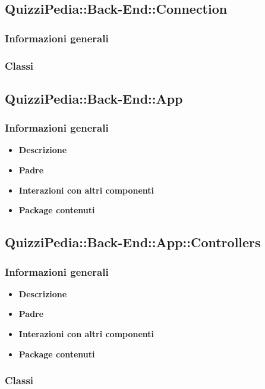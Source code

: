\subsection{QuizziPedia::Back-End::Connection}
\subsubsection{Informazioni generali}
\subsubsection{Classi}

\subsection{QuizziPedia::Back-End::App}
\subsubsection{Informazioni generali}
	\begin{itemize}
		\item \textbf{Descrizione} \\
		\item \textbf{Padre} \\
		\item \textbf{Interazioni con altri componenti} \\
		\item \textbf{Package contenuti}
	\end{itemize}
	
\subsection{QuizziPedia::Back-End::App::Controllers}
\subsubsection{Informazioni generali}
	\begin{itemize}
		\item \textbf{Descrizione} \\
		\item \textbf{Padre} \\
		\item \textbf{Interazioni con altri componenti} \\
		\item \textbf{Package contenuti}
	\end{itemize}
\subsubsection{Classi}
